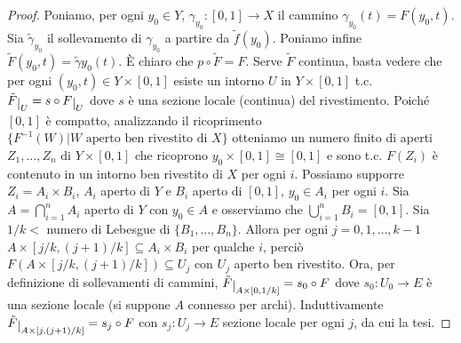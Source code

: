 \begin{proof}
  Poniamo, per ogni $y_0 \in Y$, $\gamma_{y_0}:[0, 1] \rightarrow X$ il cammino $\gamma_{y_0}(t)=F(y_0, t)$. Sia $\tilde{\gamma}_{y_0}$ il sollevamento di $\gamma_{y_0}$ a partire da $\tilde{f}(y_0)$. Poniamo infine $\tilde{F}(y_0, t)=\tilde{\gamma}{y_0}(t)$.
  È chiaro che $p \circ \tilde{F}=F$. Serve $\tilde{F}$ continua, basta vedere che per ogni $(y_0, t) \in Y \times [0, 1]$ esiste un intorno $U$ in $Y \times [0, 1]$ t.c. $\tilde{F}\restrict{U}=s \circ F\restrict{U}$ dove $s$ è una sezione locale (continua) del rivestimento.
  Poiché $[0, 1]$ è compatto, analizzando il ricoprimento $\{F^{-1}(W) | W \text{ aperto ben rivestito di } X\}$ otteniamo un numero finito di aperti $Z_1, \dots, Z_n$ di $Y \times [0, 1]$ che ricoprono $y_0 \times [0, 1] \cong [0, 1]$ e sono t.c. $F(Z_i)$ è contenuto in un intorno ben rivestito di $X$ per ogni $i$.
  Possiamo supporre $Z_i=A_i \times B_i$, $A_i$ aperto di $Y$ e $B_i$ aperto di $[0, 1]$, $y_0 \in A_i$ per ogni $i$. Sia $\displaystyle A= \bigcap_{i=1}^n A_i$ aperto di $Y$ con $y_0 \in A$ e osserviamo che $\displaystyle \bigcup_{i=1}^n B_i=[0, 1]$.
  Sia $1/k<$ numero di Lebesgue di $\{B_1, \dots, B_n\}$. Allora per ogni $j=0, 1, \dots, k-1$ $A \times [j/k, (j+1)/k] \subseteq A_i \times B_i$ per qualche $i$, perciò $F(A \times [j/k, (j+1)/k]) \subseteq U_j$ con $U_j$ aperto ben rivestito.
  Ora, per definizione di sollevamenti di cammini, $\tilde{F} \restrict{A \times [0, 1/k]}=s_0 \circ F$ dove $s_0: U_0 \rightarrow E$ è una sezione locale (si suppone $A$ connesso per archi). Induttivamente $\tilde{F} \restrict{A \times [j, (j+1)/k]}=s_j \circ F$ con $s_j: U_j \rightarrow E$ sezione locale per ogni $j$, da cui la tesi.
\end{proof}
